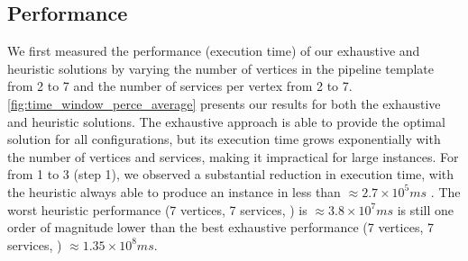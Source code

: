   \subsection{Performance}\label{subsec:experiments_performance}
  We first measured the performance (execution time) of our exhaustive and heuristic solutions by varying the number of vertices in the pipeline template from 2 to 7 and the number of services per vertex from 2 to 7. \cref{fig:time_window_perce_average} presents our results for both the exhaustive and heuristic solutions.
  The exhaustive approach is able to provide the optimal solution for all configurations, but its execution time grows exponentially with the number of vertices and services, making it impractical for large instances. For \windowsize from 1 to 3 (step 1), we observed a substantial reduction in execution time, with the heuristic always able to produce an instance in less than $\approx2.7\times10^5ms$ . The worst heuristic performance (7 vertices, 7 services, ) is $\approx3.8\times10^7ms$ is still one order of magnitude lower than the best exhaustive performance (7 vertices, 7 services, ) $\approx1.35\times10^8ms$.
